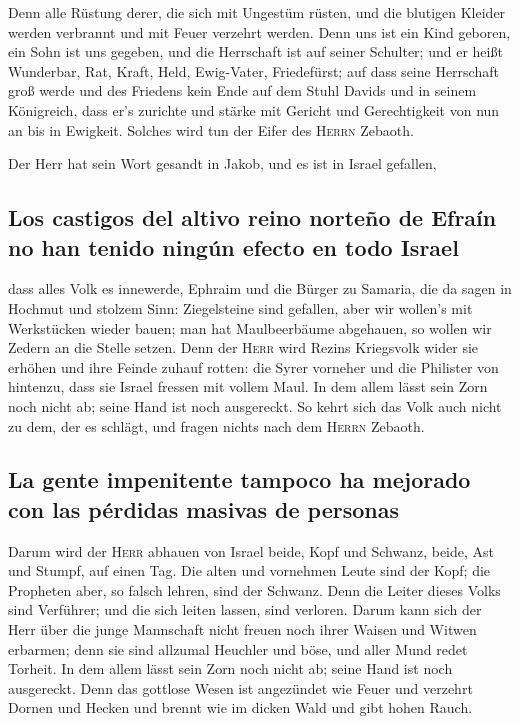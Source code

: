  Denn alle Rüstung derer, die sich mit Ungestüm rüsten,
und die blutigen Kleider werden verbrannt und mit Feuer verzehrt werden.
 Denn uns ist ein Kind geboren, ein Sohn ist uns gegeben,
und die Herrschaft ist auf seiner Schulter; und er heißt Wunderbar, Rat,
Kraft, Held, Ewig-Vater, Friedefürst;  auf dass seine
Herrschaft groß werde und des Friedens kein Ende auf dem Stuhl Davids
und in seinem Königreich, dass er's zurichte und stärke mit Gericht und
Gerechtigkeit von nun an bis in Ewigkeit. Solches wird tun der Eifer des
\textsc{Herrn} Zebaoth.

 Der Herr hat sein Wort gesandt in Jakob, und es ist in
Israel gefallen,

\hypertarget{los-castigos-del-altivo-reino-norteuxf1o-de-efrauxedn-no-han-tenido-ninguxfan-efecto-en-todo-israel}{%
\subsection{Los castigos del altivo reino norteño de Efraín no han
tenido ningún efecto en todo
Israel}\label{los-castigos-del-altivo-reino-norteuxf1o-de-efrauxedn-no-han-tenido-ninguxfan-efecto-en-todo-israel}}

 dass alles Volk es innewerde, Ephraim und die Bürger zu
Samaria, die da sagen in Hochmut und stolzem Sinn: 
Ziegelsteine sind gefallen, aber wir wollen's mit Werkstücken wieder
bauen; man hat Maulbeerbäume abgehauen, so wollen wir Zedern an die
Stelle setzen.  Denn der \textsc{Herr} wird Rezins
Kriegsvolk wider sie erhöhen und ihre Feinde zuhauf rotten:
 die Syrer vorneher und die Philister von hintenzu, dass
sie Israel fressen mit vollem Maul. In dem allem lässt sein Zorn noch
nicht ab; seine Hand ist noch ausgereckt.  So kehrt sich
das Volk auch nicht zu dem, der es schlägt, und fragen nichts nach dem
\textsc{Herrn} Zebaoth.

\hypertarget{la-gente-impenitente-tampoco-ha-mejorado-con-las-puxe9rdidas-masivas-de-personas}{%
\subsection{La gente impenitente tampoco ha mejorado con las pérdidas
masivas de
personas}\label{la-gente-impenitente-tampoco-ha-mejorado-con-las-puxe9rdidas-masivas-de-personas}}

 Darum wird der \textsc{Herr} abhauen von Israel beide,
Kopf und Schwanz, beide, Ast und Stumpf, auf einen Tag. 
Die alten und vornehmen Leute sind der Kopf; die Propheten aber, so
falsch lehren, sind der Schwanz.  Denn die Leiter dieses
Volks sind Verführer; und die sich leiten lassen, sind verloren.
 Darum kann sich der Herr über die junge Mannschaft nicht
freuen noch ihrer Waisen und Witwen erbarmen; denn sie sind allzumal
Heuchler und böse, und aller Mund redet Torheit. In dem allem lässt sein
Zorn noch nicht ab; seine Hand ist noch ausgereckt.  Denn
das gottlose Wesen ist angezündet wie Feuer und verzehrt Dornen und
Hecken und brennt wie im dicken Wald und gibt hohen Rauch.

